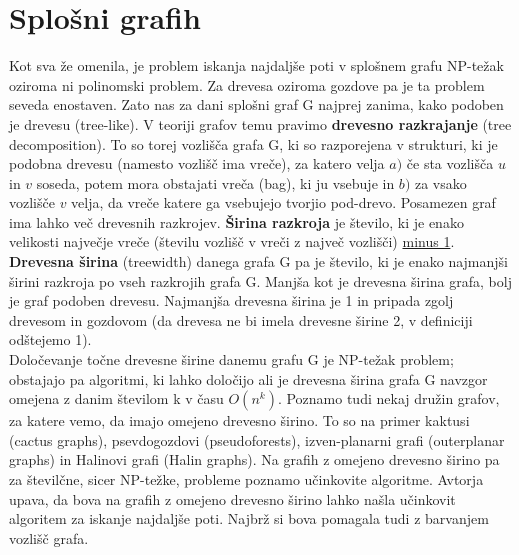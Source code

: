 \documentclass[a4paper, 12pt]{article}
\begin{document}
\section{Splošni grafih}
Kot sva že omenila, je problem iskanja najdaljše poti v splošnem grafu NP-težak oziroma ni polinomski problem. Za drevesa oziroma gozdove pa je ta problem seveda enostaven. Zato nas za dani splošni graf G najprej zanima, kako podoben je drevesu (tree-like). V teoriji grafov temu pravimo \textbf{drevesno razkrajanje} (tree decomposition). To so torej vozlišča grafa G, ki so razporejena v strukturi, ki je podobna drevesu (namesto vozlišč ima vreče), za katero velja $a)$ če sta vozlišča $u$ in $v$ soseda, potem mora obstajati vreča (bag), ki ju vsebuje in $b)$ za vsako vozlišče $v$ velja, da vreče katere ga vsebujejo tvorjio pod-drevo. Posamezen graf ima lahko več drevesnih razkrojev. \textbf{Širina razkroja} je število, ki je enako velikosti največje vreče (številu vozlišč v vreči z največ vozlišči) \underline{minus 1}. \textbf{Drevesna širina} (treewidth) danega grafa G pa je število, ki je enako najmanjši širini razkroja po vseh razkrojih grafa G. Manjša kot je drevesna širina grafa, bolj je graf podoben drevesu. Najmanjša drevesna širina je 1 in pripada zgolj drevesom in gozdovom (da drevesa ne bi imela drevesne širine 2, v definiciji odštejemo 1). 
\\
Določevanje točne drevesne širine danemu grafu G je NP-težak problem; obstajajo pa algoritmi, ki lahko določijo ali je drevesna širina grafa G navzgor omejena z danim številom k v času $O(n^k)$. Poznamo tudi nekaj družin grafov, za katere vemo, da imajo omejeno drevesno širino. To so na primer kaktusi (cactus graphs), psevdogozdovi (pseudoforests), izven-planarni grafi (outerplanar graphs) in Halinovi grafi (Halin graphs). Na grafih z omejeno drevesno širino pa za številčne, sicer NP-težke, probleme poznamo učinkovite algoritme.
Avtorja upava, da bova na grafih z omejeno drevesno širino lahko našla učinkovit algoritem za iskanje najdaljše poti. Najbrž si bova pomagala tudi z barvanjem vozlišč grafa.
\end{document}

